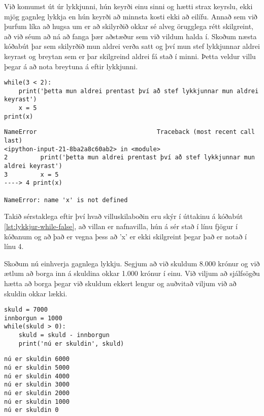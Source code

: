 Við komumst út úr lykkjunni, hún keyrði einu sinni og hætti strax keyrslu, ekki mjög gagnleg lykkja en hún keyrði að minnsta kosti ekki að eilífu.
Annað sem við þurfum líka að hugsa um er að skilyrðið okkar sé alveg örugglega rétt skilgreint, að við séum að ná að fanga þær aðstæður sem við vildum halda í.
Skoðum næsta kóðabút þar sem skilyrðið mun aldrei verða satt og því mun stef lykkjunnar aldrei keyrast og breytan sem er þar skilgreind aldrei fá stað í minni.
Þetta veldur villu þegar á að nota breytuna á eftir lykkjunni. 

\begin{lstlisting}[caption=while-lykkja sem keyrir aldrei, label=lst:lykkjur-while-false]
while(3 < 2):
	print('þetta mun aldrei prentast því að stef lykkjunnar mun aldrei keyrast')
	x = 5
print(x)
\end{lstlisting}
\lstset{style=uttak}
\begin{lstlisting}
NameError                                 Traceback (most recent call last)
<ipython-input-21-8ba2a8c60ab2> in <module>
2         print('þetta mun aldrei prentast því að stef lykkjunnar mun aldrei keyrast')
3         x = 5
----> 4 print(x)

NameError: name 'x' is not defined
\end{lstlisting}
\lstset{style=venjulegt}

Takið sérstaklega eftir því hvað villuskilaboðin eru skýr í úttakinu á kóðabút \ref{lst:lykkjur-while-false}, að villan er nafnavilla, hún á sér stað í línu fjögur í kóðanum og að það er vegna þess að 'x' er ekki skilgreint þegar það er notað í línu 4.

Skoðum nú einhverja gagnlega lykkju.
Segjum að við skuldum 8.000 krónur og við ætlum að borga inn á skuldina okkar 1.000 krónur í einu.
Við viljum að sjálfsögðu hætta að borga þegar við skuldum ekkert lengur og auðvitað viljum við að skuldin okkar lækki.

\begin{lstlisting}[caption=While-lykkja sem eitthvað vit er í, label=lst:lykkjur-while-skuld]
skuld = 7000
innborgun = 1000
while(skuld > 0):
	skuld = skuld - innborgun
	print('nú er skuldin', skuld)
\end{lstlisting}
\lstset{style=uttak}
\begin{lstlisting}
nú er skuldin 6000
nú er skuldin 5000
nú er skuldin 4000
nú er skuldin 3000
nú er skuldin 2000
nú er skuldin 1000
nú er skuldin 0
\end{lstlisting}
\lstset{style=venjulegt}

